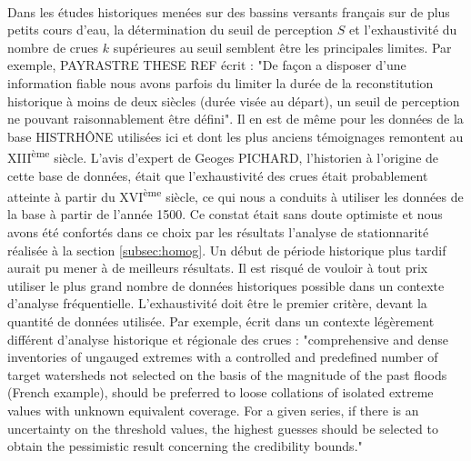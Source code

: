\documentclass[11pt]{article}
\begin{document}
	\paragraph{} Dans les études historiques menées sur des bassins versants français sur de plus petits cours d'eau, la détermination du seuil de perception $S$ et l'exhaustivité du nombre de crues $k$ supérieures au seuil semblent être les principales limites. Par exemple, PAYRASTRE THESE REF écrit : "De façon a disposer d'une information fiable nous avons parfois du limiter la durée de la reconstitution historique à moins de deux siècles (durée visée au départ), un seuil de perception ne pouvant raisonnablement être défini". Il en est de même pour les données de la base HISTRHÔNE utilisées ici et dont les plus anciens témoignages remontent au XIII\textsuperscript{ème} siècle. L'avis d'expert de Geoges PICHARD, l'historien à l'origine de cette base de données, était que l'exhaustivité des crues était probablement atteinte à partir du XVI\textsuperscript{ème} siècle, ce qui nous a conduits à utiliser les données de la base à partir de l'année 1500. Ce constat était sans doute optimiste et nous avons été confortés dans ce choix par les résultats l'analyse de stationnarité réalisée à la section \ref{subsec:homog}. Un début de période historique plus tardif aurait pu mener à de meilleurs résultats. Il est risqué de vouloir à tout prix utiliser le plus grand nombre de données historiques possible dans un contexte d'analyse fréquentielle. L'exhaustivité doit être le premier critère, devant la quantité de données utilisée. Par exemple, \cite{gaume_bayesian_2010} écrit dans un contexte légèrement différent d'analyse historique et régionale des crues : "comprehensive and dense inventories of ungauged extremes with a controlled and predefined number of target watersheds not selected on the basis of the magnitude of the past floods (French example), should be preferred to loose collations of isolated extreme values with unknown equivalent coverage. For a given series, if there is an uncertainty on the threshold values, the highest guesses should be selected to obtain the pessimistic result concerning the credibility bounds."
	
\end{document}
